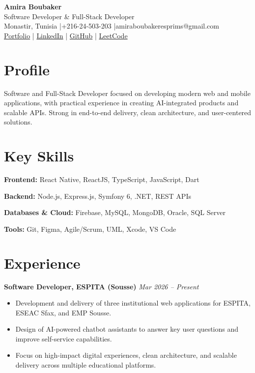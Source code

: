 \documentclass[10pt,a4paper]{article}
\begin{document}
{\centering
{\LARGE \textbf{Amira Boubaker}}\\[7pt]
Software Developer \& Full-Stack Developer \\[4pt]
Monastir, Tunisia \quad|\quad +216-24-503-203 \quad|\quad amiraboubakeresprims@gmail.com\\[4pt]
\href{https://amiraboubaker-my-new-portfolio.vercel.app/}{Portfolio} \quad|\quad
\href{https://www.linkedin.com/in/amiraboubaker15/}{LinkedIn} \quad|\quad
\href{https://github.com/amiraboubaker}{GitHub} \quad|\quad
\href{https://leetcode.com/u/Amira2023/}{LeetCode}
\par}

\section{Profile}
Software and Full-Stack Developer focused on developing modern web and mobile applications, with practical experience in creating AI-integrated products and scalable APIs. Strong in end-to-end delivery, clean architecture, and user-centered solutions.

\section{Key Skills}
\textbf{Frontend:} React Native, ReactJS, TypeScript, JavaScript, Dart

\textbf{Backend:} Node.js, Express.js, Symfony 6, .NET, REST APIs

\textbf{Databases \& Cloud:} Firebase, MySQL, MongoDB, Oracle, SQL Server

\textbf{Tools:} Git, Figma, Agile/Scrum, UML, Xcode, VS Code

\section{Experience}
\textbf{Software Developer, ESPITA (Sousse)} \hfill \textit{Mar 2026 -- Present}
\begin{itemize}
  \item Development and delivery of three institutional web applications for ESPITA, ESEAC Sfax, and EMP Sousse.
  \item Design of AI-powered chatbot assistants to answer key user questions and improve self-service capabilities.
  \item Focus on high-impact digital experiences, clean architecture, and scalable delivery across multiple educational platforms.
\end{itemize}
\end{document}
